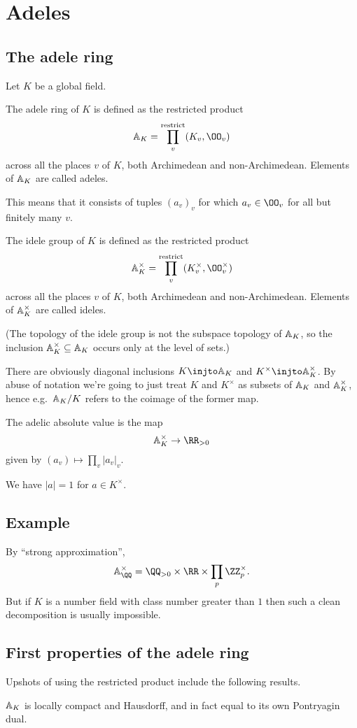 \chapter{Adeles}
\section{The adele ring}
Let $K$ be a global field.
\begin{definition}
  The \alert{adele ring} of $K$ is defined as the restricted product
  \[ \AA_K = \rprod_v (K_v, \OO_v) \]
  across all the places $v$ of $K$,
  both Archimedean and non-Archimedean.
  Elements of $\AA_K$ are called adeles.
\end{definition}
This means that it consists of tuples $(a_v)_{v}$
for which $a_v \in \OO_v$ for all but finitely many $v$.
\begin{definition}
The \alert{idele group} of $K$ is defined as the restricted product
\[ \AA_K^\times = \rprod_v (K_v^\times, \OO_v^\times) \]
across all the places $v$ of $K$,
both Archimedean and non-Archimedean.
Elements of $\AA_K^\times$ are called ideles.
\end{definition}
(The topology of the idele group is not
the subspace topology of $\AA_K$,
so the inclusion $\AA_K^\times \subseteq \AA_K$
occurs only at the level of sets.)

There are obviously diagonal inclusions
$K \injto \AA_K$ and $K^\times \injto \AA_K^{\times}$.
By abuse of notation we're going to just treat
$K$ and $K^\times$ as subsets of $\AA_K$ and $\AA_K^\times$,
hence e.g.\ $\AA_K/K$ refers to the coimage of the former map.

The adelic absolute value is the map
\[ \AA_K^\times \to \RR_{>0} \]
given by $(a_v) \mapsto \prod_v \left\lvert a_v \right\rvert_v$.
\begin{proposition}
  We have $|a|=1$ for $a \in K^\times$.
\end{proposition}

\section{Example}
By ``strong approximation'',
\[ \AA_{\QQ}^\times
  = \QQ_{>0} \times \RR \times \prod_p \ZZ_p^\times. \]
But if $K$ is a number field with class number greater than $1$
then such a clean decomposition is usually impossible.

\section{First properties of the adele ring}
Upshots of using the restricted product include
the following results.
\begin{theorem}
  $\AA_K$ is locally compact and Hausdorff,
  and in fact equal to its own Pontryagin dual.
\end{theorem}

